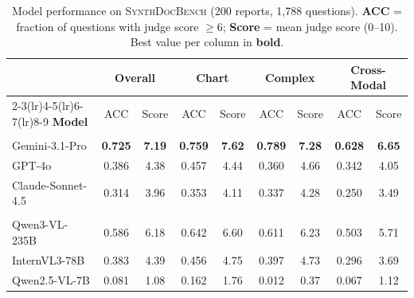 \begin{table}[t]
\centering
\small
\begin{tabular}{@{}lcccccccc@{}}
\toprule
 & \multicolumn{2}{c}{\textbf{Overall}}
 & \multicolumn{2}{c}{\textbf{Chart}}
 & \multicolumn{2}{c}{\textbf{Complex}}
 & \multicolumn{2}{c}{\textbf{Cross-Modal}} \\
\cmidrule(lr){2-3}\cmidrule(lr){4-5}\cmidrule(lr){6-7}\cmidrule(lr){8-9}
\textbf{Model} & ACC & Score & ACC & Score & ACC & Score & ACC & Score \\
\midrule
\rowcolor{gray!15}
\multicolumn{9}{c}{\textit{Proprietary Models}} \\
\midrule
Gemini-3.1-Pro    & \textbf{0.725} & \textbf{7.19} & \textbf{0.759} & \textbf{7.62} & \textbf{0.789} & \textbf{7.28} & \textbf{0.628} & \textbf{6.65} \\
GPT-4o            & 0.386 & 4.38 & 0.457 & 4.44 & 0.360 & 4.66 & 0.342 & 4.05 \\
Claude-Sonnet-4.5 & 0.314 & 3.96 & 0.353 & 4.11 & 0.337 & 4.28 & 0.250 & 3.49 \\
\midrule
\rowcolor{gray!15}
\multicolumn{9}{c}{\textit{Open-Weight Models}} \\
\midrule
Qwen3-VL-235B     & 0.586 & 6.18 & 0.642 & 6.60 & 0.611 & 6.23 & 0.503 & 5.71 \\
InternVL3-78B     & 0.383 & 4.39 & 0.456 & 4.75 & 0.397 & 4.73 & 0.296 & 3.69 \\
Qwen2.5-VL-7B     & 0.081 & 1.08 & 0.162 & 1.76 & 0.012 & 0.37 & 0.067 & 1.12 \\
\bottomrule
\end{tabular}
\caption{%
  Model performance on \textsc{SynthDocBench} (200 reports, 1,788 questions).
  \textbf{ACC} = fraction of questions with judge score $\ge 6$;
  \textbf{Score} = mean judge score (0--10).
  Best value per column in \textbf{bold}.
}
\label{tab:main_results}
\end{table}